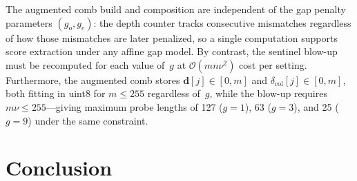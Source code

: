 \documentclass[11pt, a4paper]{article}
\theoremstyle{definition}
\theoremstyle{remark}
\newcommand{\dcol}{\mathbf{d}}
\newcommand{\bigO}{\mathcal{O}}
\begin{document}
The augmented comb build and composition are independent of the
gap penalty parameters $(g_o, g_e)$: the depth counter tracks
consecutive mismatches regardless of how those mismatches are
later penalized, so a single computation supports score
extraction under any affine gap model.
By contrast, the sentinel
blow-up must be recomputed for each value of~$g$ at
$\bigO(mn\nu^2)$ cost per setting.
Furthermore, the augmented
comb stores $\dcol[j] \in [0, m]$ and
$\delta_{\mathrm{col}}[j] \in [0, m]$, both fitting in uint8 for
$m \leq 255$ regardless of~$g$, while the blow-up requires
$m\nu \leq 255$---giving maximum probe lengths of 127 ($g{=}1$),
63 ($g{=}3$), and 25 ($g{=}9$) under the same constraint.

\section{Conclusion}\label{sec:conclusion}
\end{document}
